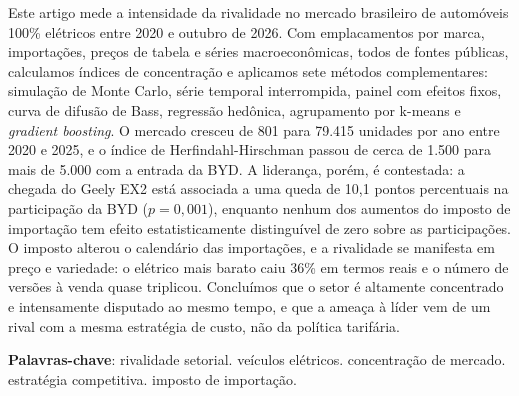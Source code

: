 \documentclass[article,11pt,oneside,a4paper,english,brazil,sumario=tradicional]{abntex2}
\begin{document}
\frenchspacing

\maketitle

\begin{resumoumacoluna}
Este artigo mede a intensidade da rivalidade no mercado brasileiro de automóveis 100\% elétricos entre 2020 e outubro de 2026. Com emplacamentos por marca, importações, preços de tabela e séries macroeconômicas, todos de fontes públicas, calculamos índices de concentração e aplicamos sete métodos complementares: simulação de Monte Carlo, série temporal interrompida, painel com efeitos fixos, curva de difusão de Bass, regressão hedônica, agrupamento por k-means e \textit{gradient boosting}. O mercado cresceu de 801 para 79.415 unidades por ano entre 2020 e 2025, e o índice de Herfindahl-Hirschman passou de cerca de 1.500 para mais de 5.000 com a entrada da BYD. A liderança, porém, é contestada: a chegada do Geely EX2 está associada a uma queda de 10,1 pontos percentuais na participação da BYD ($p = 0{,}001$), enquanto nenhum dos aumentos do imposto de importação tem efeito estatisticamente distinguível de zero sobre as participações. O imposto alterou o calendário das importações, e a rivalidade se manifesta em preço e variedade: o elétrico mais barato caiu 36\% em termos reais e o número de versões à venda quase triplicou. Concluímos que o setor é altamente concentrado e intensamente disputado ao mesmo tempo, e que a ameaça à líder vem de um rival com a mesma estratégia de custo, não da política tarifária.

\vspace{\onelineskip}
\noindent
\textbf{Palavras-chave}: rivalidade setorial. veículos elétricos. concentração de mercado. estratégia competitiva. imposto de importação.
\end{resumoumacoluna}
\end{document}

